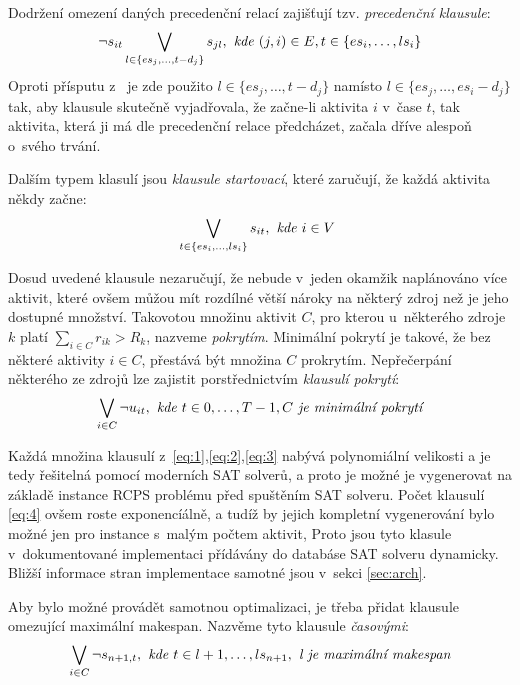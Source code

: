 \documentclass[a4paper, 12pt]{article}
\begin{document}
Dodržení omezení daných precedenční relací zajišťují tzv. \emph{precedenční klausule}:
\begin{equation}
\label{eq:2}
   \neg s_{it} \bigvee_{l\in\{es_j,\ldots,t-d_j\}} s_{jl},\emph{ kde } (j,i) \in E, t \in\{es_i,\ldots,ls_i\}   
\end{equation}
Oproti přísputu z~\cite{horbach:10} je zde použito $l\in\{es_j,\ldots,t-d_j\}$ namísto $l\in\{es_j,\ldots,es_i-d_j\}$ tak,
aby klausule skutečně vyjadřovala, že začne-li aktivita $i$ v~čase $t$, tak aktivita, která ji má dle precedenční
relace předcházet, začala dříve alespoň o~svého trvání.

Dalším typem klasulí jsou \emph{klausule startovací}, které zaručují, že každá aktivita někdy začne:
\begin{equation}
\label{eq:3}
   \bigvee_{t\in\{es_i,\ldots,ls_{i}\}} s_{it},\emph{ kde } i \in
V~\end{equation}

Dosud uvedené klausule nezaručují, že nebude v~jeden okamžik naplánováno více aktivit, které ovšem můžou mít rozdílné
větší nároky na některý zdroj než je jeho dostupné množství.
Takovotou množinu aktivit $C$, pro kterou u~některého zdroje $k$ platí $\sum_{i\in C} r_{ik} > R_k$, nazveme \emph{pokrytím}.
Minimální pokrytí je takové, že bez některé aktivity $i\in C$, přestává být množina $C$ prokrytím.
Nepřečerpání některého ze zdrojů lze zajistit porstřednictvím \emph{klausulí pokrytí}:
\begin{equation}
\label{eq:4}
   \bigvee_{i\in C} \neg u_{it},\emph{ kde } t\in{0,\ldots,T-1}, C \emph{ je minimální pokrytí}   
\end{equation}

Každá množina klausulí z~\ref{eq:1},\ref{eq:2},\ref{eq:3} nabývá polynomiální velikosti a je tedy řešitelná pomocí moderních SAT solverů,
a proto je možné je vygenerovat na základě instance RCPS problému před spuštěním SAT solveru.
Počet klausulí \ref{eq:4} ovšem roste exponencíálně, a tudíž by jejich kompletní vygenerování bylo možné jen pro instance
s~malým počtem aktivit,
Proto jsou tyto klasule v~dokumentované implementaci přídávány do databáse SAT solveru dynamicky.
Bližší informace stran implementace samotné jsou v~sekci \ref{sec:arch}.

Aby bylo možné provádět samotnou optimalizaci, je třeba přidat klausule omezující maximální makespan.
Nazvěme tyto klausule \emph{časovými}:
\begin{equation}
\label{eq:5}
   \bigvee_{i\in C} \neg s_{n+1,t},\emph{ kde } t\in{l+1,\ldots,ls_{n+1}}, \emph{ l je maximální makespan}   
\end{equation}
\end{document}
